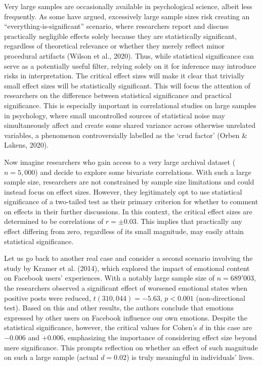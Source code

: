 \documentclass[
  man]{apa7}
\begin{document}
Very large samples are occasionally available in psychological science, albeit less frequently. As some have argued, excessively large sample sizes risk creating an ``everything-is-significant'' scenario, where researchers report and discuss practically negligible effects solely because they are statistically significant, regardless of theoretical relevance or whether they merely reflect minor procedural artifacts (Wilson et al., 2020). Thus, while statistical significance can serve as a potentially useful filter, relying solely on it for inference may introduce risks in interpretation. The critical effect sizes will make it clear that trivially small effect sizes will be statistically significant. This will focus the attention of researchers on the difference between statistical significance and practical significance. This is especially important in correlational studies on large samples in psychology, where small uncontrolled sources of statistical noise may simultaneously affect and create some shared variance across otherwise unrelated variables, a phenomenon controversially labelled as the `crud factor' (Orben \& Lakens, 2020).

Now imagine researchers who gain access to a very large archival dataset (\(n = 5,000\)) and decide to explore some bivariate correlations. With such a large sample size, researchers are not constrained by sample size limitations and could instead focus on effect sizes. However, they legitimately opt to use statistical significance of a two-tailed test as their primary criterion for whether to comment on effects in their further discussions. In this context, the critical effect sizes are determined to be correlations of \(r = \pm 0.03\). This implies that practically any effect differing from zero, regardless of its small magnitude, may easily attain statistical significance.

Let us go back to another real case and consider a second scenario involving the study by Kramer et al. (2014), which explored the impact of emotional content on Facebook users' experiences. With a notably large sample size of \(n = 689'003\), the researchers observed a significant effect of worsened emotional states when positive posts were reduced, \(t(310,044) = −5.63\), \(p < 0.001\) (non-directional test). Based on this and other results, the authors conclude that emotions expressed by other users on Facebook influence our own emotions. Despite the statistical significance, however, the critical values for Cohen's \(d\) in this case are \(-0.006\) and \(+0.006\), emphasizing the importance of considering effect size beyond mere significance. This prompts reflection on whether an effect of such magnitude on such a large sample (actual \(d = 0.02\)) is truly meaningful in individuals' lives.
\end{document}
